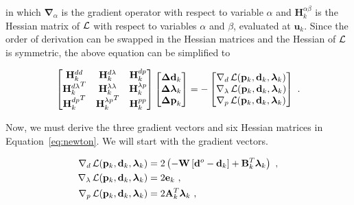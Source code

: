\noindent
in which $\mathbf{\nabla}_\alpha$ is the gradient operator with respect to
variable $\alpha$ and
$\mathbf{H}_k^{\alpha\beta}$ is the Hessian matrix of $\operatorname{\mathcal{L}}$ with respect to
variables $\alpha$ and $\beta$, evaluated at $\mathbf{u}_k$.
Since the order of derivation can be swapped in the Hessian matrices and the
Hessian of $\operatorname{\mathcal{L}}$ is symmetric, the above equation can be simplified to

\begin{equation}
    \begin{bmatrix}
      \mathbf{H}^{dd}_k & \mathbf{H}^{d\lambda}_k & \mathbf{H}^{dp}_k \\
      {\mathbf{H}^{d\lambda}_k}^T & \mathbf{H}^{\lambda\lambda}_k & \mathbf{H}^{\lambda p}_k \\
      {\mathbf{H}^{dp}_k}^T & {\mathbf{H}^{\lambda p}_k}^T & \mathbf{H}^{pp}_k
    \end{bmatrix}
  \begin{bmatrix}
    \mathbf{\Delta d}_k \\
    \boldsymbol{\Delta\lambda}_k \\
    \mathbf{\Delta p}_k
  \end{bmatrix}
  = -
    \begin{bmatrix}
      \mathbf{\nabla}_d\operatorname{\mathcal{L}}(\mathbf{p}_k,\mathbf{d}_k,\boldsymbol{\lambda}_k) \\
      \mathbf{\nabla}_\lambda\operatorname{\mathcal{L}}(\mathbf{p}_k,\mathbf{d}_k,\boldsymbol{\lambda}_k) \\
      \mathbf{\nabla}_p\operatorname{\mathcal{L}}(\mathbf{p}_k,\mathbf{d}_k,\boldsymbol{\lambda}_k)
    \end{bmatrix}
  \ .
  \label{eq:newton}
\end{equation}

Now, we must derive the three gradient vectors and six Hessian matrices in
Equation~\ref{eq:newton}.
We will start with the gradient vectors.

\begin{equation}
  \begin{aligned}
    \mathbf{\nabla}_d\operatorname{\mathcal{L}}(\mathbf{p}_k,\mathbf{d}_k,\boldsymbol{\lambda}_k) &=
      2\left(-\mathbf{W}\left[\mathbf{d}^o - \mathbf{d}_k\right]
      + \mathbf{B}_k^T\boldsymbol{\lambda}_k\right)
    \ ,
    \\
    \mathbf{\nabla}_\lambda\operatorname{\mathcal{L}}(\mathbf{p}_k,\mathbf{d}_k,\boldsymbol{\lambda}_k) &=
      2\mathbf{e}_k
    \ ,
    \\
    \mathbf{\nabla}_p\operatorname{\mathcal{L}}(\mathbf{p}_k,\mathbf{d}_k,\boldsymbol{\lambda}_k) &=
      2\mathbf{A}_k^T\boldsymbol{\lambda}_k
    \ ,
  \end{aligned}
  \label{eq:grad}
\end{equation}

